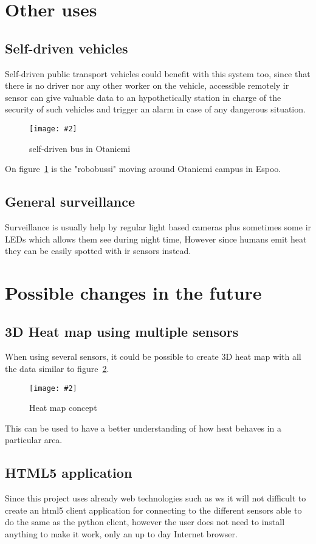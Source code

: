 \documentclass[hidelinks,11pt,a4paper,oneside,article]{memoir}
\newcommand{\putimage}[3][10] %
{
\begin{figure}[h]
	\centering
	\captionsetup{justification=centering}
	\texttt{[image: \#2]}
	\caption{#3}
	\label{fig:#2}
\end{figure}
}
\begin{document}
\section{Other uses}
\subsection{Self-driven vehicles}
Self-driven public transport vehicles could benefit with this system too, since that there is no driver nor any other worker on the vehicle, accessible remotely \gls{ir} sensor can give valuable data to an hypothetically station in charge of the security of such vehicles and trigger an alarm in case of any dangerous situation.

    \putimage{robo-bussi}{self-driven bus in Otaniemi}
    
On figure~\ref{fig:robo-bussi} is the "robobussi" moving around Otaniemi campus in Espoo.

\subsection{General surveillance}
Surveillance is usually help by regular light based cameras plus sometimes some \gls{ir} LEDs which allows them see during night time, However since humans emit heat they can be easily spotted with \gls{ir} sensors instead.

\section{Possible changes in the future}
\subsection{3D Heat map using multiple sensors}
When using several sensors, it could be possible to create 3D heat map with all the data similar to figure~\ref{fig:heatmap}.

    \putimage[10]{heatmap}{Heat map concept}
    
This can be used to have a better understanding of how heat behaves in a particular area.

\subsection{HTML5 application}
Since this project uses already web technologies such as \gls{ws} it will not difficult to create an \gls{html}5 client application for connecting to the different sensors able to do the same as the python client, however the user does not need to install anything to make it work, only an up to day Internet browser.
\end{document}
